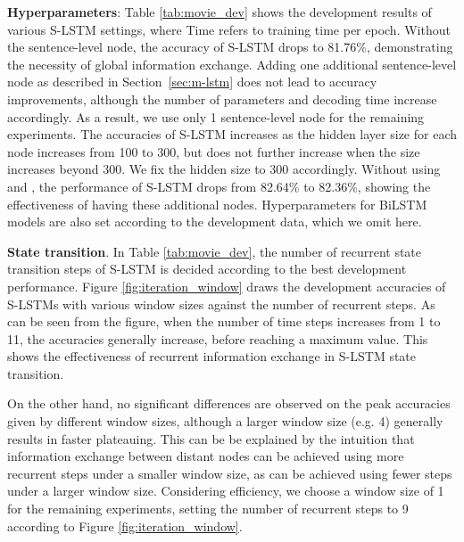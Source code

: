 \documentclass[11pt,a4paper]{article}
\begin{document}
\textbf{Hyperparameters}: Table \ref{tab:movie_dev} shows the development results of various S-LSTM settings, where Time refers to training time per epoch.
Without the sentence-level node, the accuracy of S-LSTM drops to 81.76\%, demonstrating the necessity of global information exchange. 
Adding one additional sentence-level node as described in Section~\ref{sec:m-lstm} does not lead to accuracy improvements, although the number of parameters and decoding time increase accordingly. 
As a result, we use only 1 sentence-level node for the remaining experiments.  
The accuracies of S-LSTM increases as the hidden layer size for each node increases from 100 to 300, but does not further increase when the size increases beyond 300. 
We fix the hidden size to 300 accordingly. 
Without using  and , the performance of S-LSTM drops from 82.64\% to 82.36\%, showing the effectiveness of having these additional nodes. 
Hyperparameters for BiLSTM models are also set according to the development data, which we omit here.





{\bf State transition}. In Table \ref{tab:movie_dev}, the number of recurrent state transition steps of S-LSTM is decided according to the best development performance. 
Figure \ref{fig:iteration_window} draws the development accuracies of S-LSTMs with various window sizes against the number of recurrent steps. 
As can be seen from the figure, when the number of time steps increases from 1 to 11, the accuracies generally increase, before reaching a maximum value. 
This shows the effectiveness of recurrent information exchange in S-LSTM state transition.


On the other hand, no significant differences are observed on the peak accuracies given by different window sizes, although a larger window size (e.g. 4) generally results in faster plateauing. 
This can be be explained by the intuition that information exchange between distant nodes can be achieved using more recurrent steps under a smaller window size, as can be achieved using fewer steps under a larger window size.
Considering efficiency, we choose a window size of 1 for the remaining experiments, setting the number of recurrent steps to 9 according to Figure \ref{fig:iteration_window}.
\end{document}
